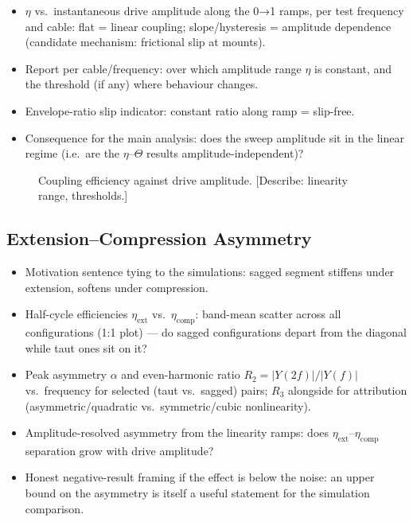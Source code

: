 \begin{itemize}
  \item $\eta$ vs.\ instantaneous drive amplitude along the 0→1 ramps, per
    test frequency and cable: flat = linear coupling; slope/hysteresis =
    amplitude dependence (candidate mechanism: frictional slip at mounts).
  \item Report per cable/frequency: over which amplitude range $\eta$ is
    constant, and the threshold (if any) where behaviour changes.
  \item Envelope-ratio slip indicator: constant ratio along ramp = slip-free.
  \item Consequence for the main analysis: does the sweep amplitude sit in
    the linear regime (i.e.\ are the $\eta$–$\Theta$ results
    amplitude-independent)?
\end{itemize}

\begin{figure}[htb]
  \centering
  \caption{Coupling efficiency against drive amplitude. [Describe: linearity
    range, thresholds.]}
  \label{fig:res:linearity}
\end{figure}

\subsection{Extension--Compression Asymmetry}
\label{sec:res:asymmetry}

\begin{itemize}
  \item Motivation sentence tying to the simulations: sagged segment stiffens
    under extension, softens under compression.
  \item Half-cycle efficiencies $\eta_\mathrm{ext}$ vs.\
    $\eta_\mathrm{comp}$: band-mean scatter across all configurations
    (1:1 plot) — do sagged configurations depart from the diagonal while taut
    ones sit on it?
  \item Peak asymmetry $\alpha$ and even-harmonic ratio $R_2 = |Y(2f)|/|Y(f)|$
    vs.\ frequency for selected (taut vs.\ sagged) pairs; $R_3$ alongside for
    attribution (asymmetric/quadratic vs.\ symmetric/cubic nonlinearity).
  \item Amplitude-resolved asymmetry from the linearity ramps: does
    $\eta_\mathrm{ext}$–$\eta_\mathrm{comp}$ separation grow with drive
    amplitude?
  \item Honest negative-result framing if the effect is below the noise: an
    upper bound on the asymmetry is itself a useful statement for the
    simulation comparison.
\end{itemize}

